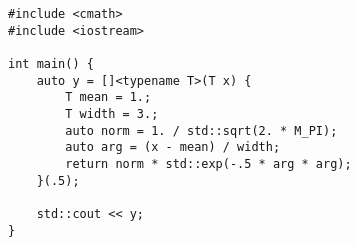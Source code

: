 \begin{lstlisting}[title=\href{https://godbolt.org/z/3jKdM7}{\texttt{godbolt.org/z/3jKdM7}}]
#include <cmath>
#include <iostream>

int main() {
    auto y = []<typename T>(T x) {
        T mean = 1.;
        T width = 3.;
        auto norm = 1. / std::sqrt(2. * M_PI);
        auto arg = (x - mean) / width;
        return norm * std::exp(-.5 * arg * arg);
    }(.5);

    std::cout << y;
}
\end{lstlisting}
